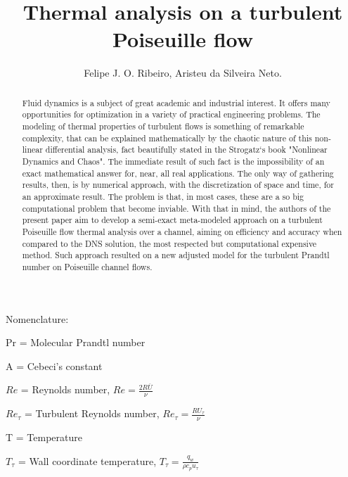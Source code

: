 \documentclass[10pt]{article} %
\title{ \loll Thermal analysis on a turbulent Poiseuille flow}
\author{Felipe J. O. Ribeiro, Aristeu da Silveira Neto.}
\begin{document}
\maketitle


\begin{abstract}
	\noindent Fluid dynamics is a subject of great academic and industrial interest. It offers many opportunities for optimization in a variety of practical engineering problems. The modeling of thermal properties of turbulent flows is something of remarkable complexity, that can be explained mathematically by the chaotic nature of this non-linear differential analysis, fact beautifully stated in the Strogatz`s book "Nonlinear Dynamics and Chaos". The immediate result of such fact is the impossibility of an exact mathematical answer for, near, all real applications. The only way of gathering results, then, is by numerical approach, with the discretization of space and time, for an approximate result. The problem is that, in most cases, these are a so big computational problem that become inviable. With that in mind, the authors of the present paper aim to develop a semi-exact meta-modeled approach on a turbulent Poiseuille flow thermal analysis over a channel, aiming on efficiency and accuracy when compared to the DNS solution, the most respected but computational expensive method. Such approach resulted on a new adjusted model for the turbulent Prandtl number on Poiseuille channel flows.
\end{abstract} 

\vspace{8.0mm}

\begin{LARGE}
	Nomenclature: 
\end{LARGE} 


	Pr = Molecular Prandtl number
	
	A = Cebeci's constant
	
	
	$Re$ = Reynolds number, $Re = \frac{2R \overline{U}}{\nu}$
	
	
	$Re_\tau$ = Turbulent Reynolds number, $Re_\tau = \frac{R U_\tau}{\nu}$
	
	
	
	T = Temperature
	
	
	
	$T_\tau$ = Wall coordinate temperature, $T_\tau = \frac{q_w}{\rho c_p u_\tau}$ 
	
\end{document}
